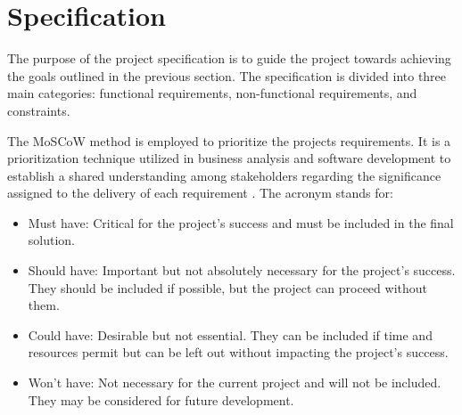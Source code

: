 \documentclass[12pt, conference, final, a4paper, onecolumn, compsoc]{IEEEtran}
\begin{document}






\section{Specification}

The purpose of the project specification is to guide the project towards
achieving the goals outlined in the previous section. The specification is
divided into three main categories: functional requirements, non-functional
requirements, and constraints.

The MoSCoW method is employed to prioritize the projects requirements. It is a
prioritization technique utilized in business analysis and software development
to establish a shared understanding among stakeholders regarding the
significance assigned to the delivery of each requirement
\citep{moscow-prioritization}. The acronym stands for:

\begin{itemize}
  \item Must have: Critical for the project's success and must be included in
        the final solution.
  \item Should have: Important but not absolutely necessary for the project's
        success. They should be included if possible, but the project can
        proceed without them.
  \item Could have: Desirable but not essential. They can be included if time
        and resources permit but can be left out without impacting the project's
        success.
  \item Won't have: Not necessary for the current project and will not be
        included. They may be considered for future development.
\end{itemize}
\end{document}
